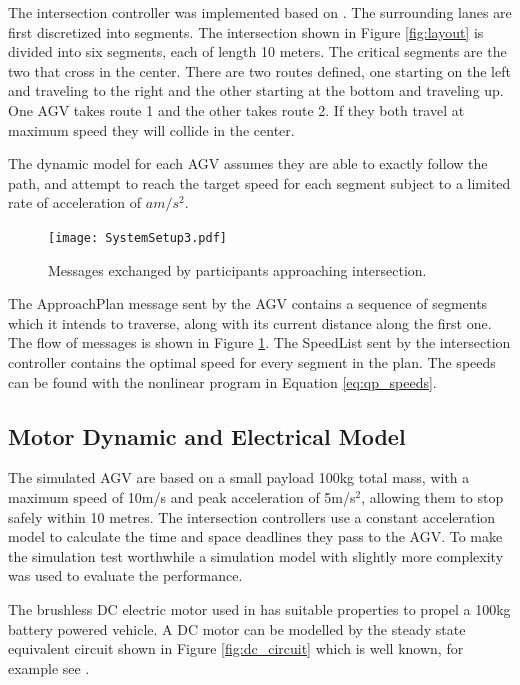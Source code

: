 \documentclass[]{article}
\begin{document}
The intersection controller was implemented based on \cite{Digani2019}. The surrounding lanes are first discretized into segments. The intersection shown in Figure \ref{fig:layout} is divided into six segments, each of length 10 meters. The critical segments are the two that cross in the center. There are two routes defined, one starting on the left and traveling to the right and the other starting at the bottom and traveling up. One AGV takes route 1 and the other takes route 2. If they both travel at maximum speed they will collide in the center.

The dynamic model for each AGV assumes they are able to exactly follow the path, and attempt to reach the target speed for each segment subject to a limited rate of acceleration of $a m/s^2$. 

\begin{figure}[ht]
	\centering
	\texttt{[image: SystemSetup3.pdf]}
	\caption{Messages exchanged by participants approaching intersection.}
	\label{fig:system_setup}
\end{figure}

The ApproachPlan message sent by the AGV contains a sequence of segments which it intends to traverse, along with its current distance along the first one.  The flow of messages is shown in Figure \ref{fig:system_setup}. The SpeedList sent by the intersection controller contains the optimal speed for every segment in the plan. The speeds can be found with the nonlinear program in Equation \ref{eq:qp_speeds}. 

\subsection{Motor Dynamic and Electrical Model}
The simulated AGV are based on a small payload 100kg total mass, with a maximum speed of 10m/s and peak acceleration of 5m/s$^2$, allowing them to stop safely within 10 metres. The intersection controllers use a constant acceleration model to calculate the time and space deadlines they pass to the AGV. To make the simulation test worthwhile a simulation model with slightly more complexity was used to evaluate the performance.


The brushless DC electric motor used in \cite{Racewicz2018} has suitable properties to propel a 100kg battery powered vehicle. A DC motor can be modelled by the steady state equivalent circuit shown in Figure \ref{fig:dc_circuit} which is well known, for example see \cite{Hughes2008}. 
\end{document}

